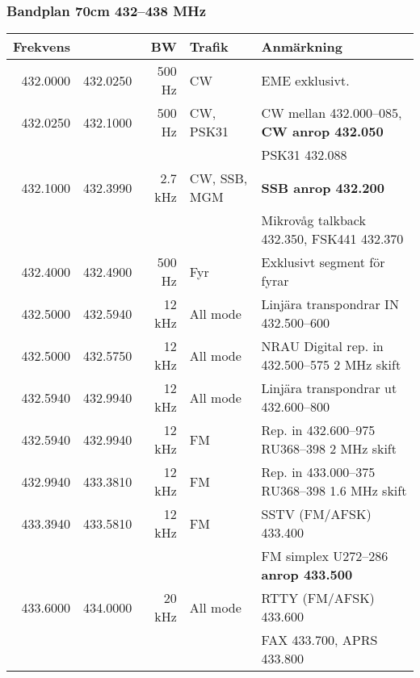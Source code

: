 \subsubsection{Bandplan 70cm 432--438 MHz}
\begin{tabular}{rrrll}
	\textbf{Frekvens} &          & \textbf{BW} & \textbf{Trafik} & \textbf{Anmärkning}                               \\ \hline

432.0000 & 432.0250 & 500 Hz  & CW           & EME exklusivt.                                    \\ \hline
432.0250 & 432.1000 & 500 Hz  & CW, PSK31    & CW mellan 432.000--085, \textbf{CW anrop 432.050} \\
         &          &         &              & PSK31 432.088                                     \\ \hline
432.1000 & 432.3990 & 2.7 kHz & CW, SSB, MGM & \textbf{SSB anrop 432.200}                        \\
         &          &         &              & Mikrovåg talkback 432.350, FSK441 432.370         \\ \hline
432.4000 & 432.4900 & 500 Hz  & Fyr          & Exklusivt segment för fyrar                       \\ \hline
432.5000 & 432.5940 & 12 kHz  & All mode     & Linjära transpondrar IN 432.500--600              \\ \hline
432.5000 & 432.5750 & 12 kHz  & All mode     & NRAU Digital rep. in 432.500--575 2 MHz skift     \\ \hline
432.5940 & 432.9940 & 12 kHz  & All mode     & Linjära transpondrar ut 432.600--800              \\ \hline
432.5940 & 432.9940 & 12 kHz  & FM           & Rep. in 432.600--975 RU368--398 2 MHz skift       \\ \hline
432.9940 & 433.3810 & 12 kHz  & FM           & Rep. in 433.000--375 RU368--398 1.6 MHz skift     \\ \hline
433.3940 & 433.5810 & 12 kHz  & FM           & SSTV (FM/AFSK) 433.400                            \\
         &          &         &              & FM simplex U272--286 \textbf{anrop 433.500}       \\ \hline
433.6000 & 434.0000 & 20 kHz  & All mode     & RTTY (FM/AFSK) 433.600                            \\
         &          &         &              & FAX 433.700, APRS 433.800                         \\ \hline

\end{tabular}
